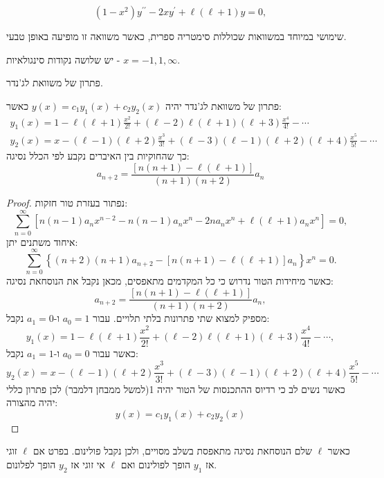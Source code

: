\documentclass{tstextbook}
\begin{document}
\begin{definition}
$$(1-x^{2})y^{\prime\prime}-2x y^{\prime}+\ell(\ell+1)y=0,$$

\end{definition}
\begin{remark}
שימושי במיוחד במשוואות שכוללות סימטריה ספרית, כאשר משוואה זו מופיעה באופן טבעי.

\end{remark}
\begin{proposition}
יש שלושה נקודות סינגולאיות - \(x=-1,1,\infty\). 

\end{proposition}
\begin{definition}
פתרון של משוואת לג'נדר.

\end{definition}
\begin{proposition}
פתרון של משוואת לג'נדר יהיה \(y(x)=c_{1}y_{1}(x)+c_{2}y_{2}(x)\) כאשר:
\begin{gather*}y_{1}(x)=1-\ell(\ell+1)\frac{x^{2}}{2!}+(\ell-2)\ell(\ell+1)(\ell+3)\frac{x^{4}}{4!}-\cdots \\y_{2}(x)=x-(\ell-1)(\ell+2)\frac{x^{3}}{3!}+(\ell-3)(\ell-1)(\ell+2)(\ell+4)\frac{x^{5}}{5!}-\cdots
\end{gather*}
כך שהחוקיות בין האיברים נקבע לפי הכלל נסיגה:
$$a_{n+2}=\frac{[n(n+1)-\ell(\ell+1)]}{(n+1)(n+2)}a_{n}$$

\end{proposition}
\begin{proof}
נפתור בעזרת טור חזקות:
$$\sum_{n=0}^{\infty}\left[n(n-1)a_{n}x^{n-2}-n(n-1)a_{n}x^{n}-2n a_{n}x^{n}+\ell(\ell+1)a_{n}x^{n}\right]=0,$$
איחוד משתנים יתן:
$$\sum_{n=0}^{\infty}\left\{(n+2)(n+1)a_{n+2}-[n(n+1)-\ell(\ell+1)]a_{n}\right\}x^{n}=0.$$
כאשר מיחידות הטור נדרוש כי כל המקדמים מתאפסים, מכאן נקבל את הנוסחאת נסיגה:
$$a_{n+2}=\frac{[n(n+1)-\ell(\ell+1)]}{(n+1)(n+2)}a_{n},$$
מספיק למצוא שתי פתרונות בלתי תלויים. עבור \(a_{0}=1\) ו-\(a_{1}=0\) נקבל:
$$y_{1}(x)=1-\ell(\ell+1)\frac{x^{2}}{2!}+(\ell-2)\ell(\ell+1)(\ell+3)\frac{x^{4}}{4!}-\cdots,$$
כאשר עבור \(a_{0}=0\) ו-\(a_{1}=1\) נקבל:
$$y_{2}(x)=x-(\ell-1)(\ell+2)\frac{x^{3}}{3!}+(\ell-3)(\ell-1)(\ell+2)(\ell+4)\frac{x^{5}}{5!}-\cdots$$
כאשר נשים לב כי רדיוס ההתכנסות של הטור יהיה 1(למשל ממבחן דלמבר)
לכן פתרון כללי יהיה מהצורה:
$$y(x)=c_{1}y_{1}(x)+c_{2}y_{2}(x)$$

\end{proof}
\begin{proposition}
כאשר \(\ell\) שלם הנוסחאת נסיגה מתאפסת בשלב מסויים, ולכן נקבל פולינום. בפרט אם \(\ell\) זוגי אז \(y_{1}\) הופך לפולינום ואם \(\ell\) אי זוגי אז \(y_{2}\) הופך לפלונום. 

\end{proposition}
\end{document}
